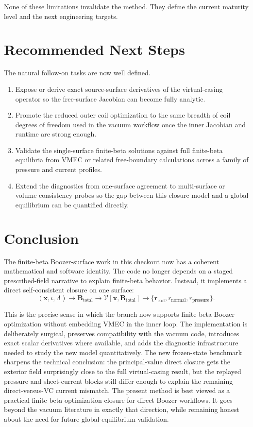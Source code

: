 \documentclass[11pt]{article}
\begin{document}
None of these limitations invalidate the method. They define the current maturity level and the next engineering targets.

\section{Recommended Next Steps}
The natural follow-on tasks are now well defined.

\begin{enumerate}
\item Expose or derive exact source-surface derivatives of the virtual-casing operator so the free-surface Jacobian can become fully analytic.
\item Promote the reduced outer coil optimization to the same breadth of coil degrees of freedom used in the vacuum workflow once the inner Jacobian and runtime are strong enough.
\item Validate the single-surface finite-beta solutions against full finite-beta equilibria from VMEC or related free-boundary calculations across a family of pressure and current profiles.
\item Extend the diagnostics from one-surface agreement to multi-surface or volume-consistency probes so the gap between this closure model and a global equilibrium can be quantified directly.
\end{enumerate}

\section{Conclusion}
The finite-beta Boozer-surface work in this checkout now has a coherent mathematical and software identity. The code no longer depends on a staged prescribed-field narrative to explain finite-beta behavior. Instead, it implements a direct self-consistent closure on one surface:
\begin{equation}
  (\mathbf{x},\iota,\Lambda)
  \longrightarrow
  \mathbf{B}_{\mathrm{total}}
  \longrightarrow
  \mathcal{V}[\mathbf{x},\mathbf{B}_{\mathrm{total}}]
  \longrightarrow
  \{\mathbf{r}_{\mathrm{coil}}, r_{\mathrm{normal}}, r_{\mathrm{pressure}}\}.
\end{equation}

This is the precise sense in which the branch now supports finite-beta Boozer optimization without embedding VMEC in the inner loop. The implementation is deliberately surgical, preserves compatibility with the vacuum code, introduces exact scalar derivatives where available, and adds the diagnostic infrastructure needed to study the new model quantitatively. The new frozen-state benchmark sharpens the technical conclusion: the principal-value direct closure gets the exterior field surprisingly close to the full virtual-casing result, but the replayed pressure and sheet-current blocks still differ enough to explain the remaining direct-versus-VC current mismatch. The present method is best viewed as a practical finite-beta optimization closure for direct Boozer workflows. It goes beyond the vacuum literature in exactly that direction, while remaining honest about the need for future global-equilibrium validation.
\end{document}
